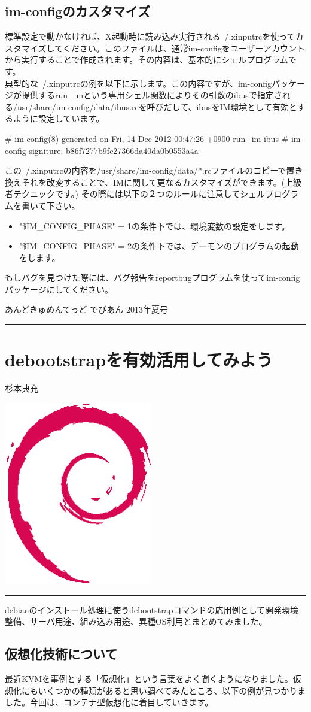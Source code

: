 \documentclass[mingoth,a4paper]{jsarticle}
\renewcommand{\dancersection}[2]{%
\newpage
あんどきゅめんてっど でびあん 2013年夏号
%
\vspace{0.1mm}\\
{\color{dancerdarkblue}\rule{\hsize}{2mm}}

%
%
\begin{minipage}[t]{0.6\hsize}
\color{dancerdarkblue}
\vspace{1cm}
\section{#1}
\hfill{}#2\\
\end{minipage}
\begin{minipage}[t]{0.4\hsize}
\vspace{-2cm}
\hfill{}\includegraphics[height=8cm]{image200502/openlogo-nd.eps}\\
\vspace{-5cm}
\end{minipage}
%
{\color{dancerlightblue}\rule{0.66\hsize}{2mm}}
%
\vspace{2cm}
}
\begin{document}
\subsection{im-configのカスタマイズ}
標準設定で動かなければ、X起動時に読み込み実行される~/.xinputrcを使ってカスタマイズしてください。このファイルは、通常im-configをユーザーアカウントから実行することで作成されます。その内容は、基本的にシェルプログラムです。
\\
典型的な~/.xinputrcの例を以下に示します。この内容ですが、im-configパッケージが提供するrun\_imという専用シェル関数によりその引数のibusで指定される/usr/share/im-config/data/ibus.rcを呼びだして、ibusをIM環境として有効とするように設定しています。
\begin{commandline}
# im-config(8) generated on Fri, 14 Dec 2012 00:47:26 +0900
run_im ibus
# im-config signiture: b86f7277b9fc27366da40da0b0553a4a  -
\end{commandline}
この~/.xinputrcの内容を/usr/share/im-config/data/*.rcファイルのコピーで置き換えそれを改変することで、IMに関して更なるカスタマイズができます。(上級者テクニックです。)
その際には以下の２つのルールに注意してシェルプログラムを書いて下さい。
\begin{itemize}
\item "\$IM\_CONFIG\_PHASE" = 1の条件下では、環境変数の設定をします。
\item "\$IM\_CONFIG\_PHASE" = 2の条件下では、デーモンのプログラムの起動をします。
\end{itemize}
もしバグを見つけた際には、バグ報告をreportbugプログラムを使ってim-configパッケージにしてください。

\dancersection{debootstrapを有効活用してみよう}{杉本典充}

debianのインストール処理に使うdebootstrapコマンドの応用例として開発環境整備、サーバ用途、組み込み用途、異種OS利用とまとめてみました。

\subsection{仮想化技術について}
最近KVMを事例とする「仮想化」という言葉をよく聞くようになりました。仮想化にもいくつかの種類があると思い調べてみたところ、以下の例が見つかりました。今回は、コンテナ型仮想化に着目していきます。
\end{document}
